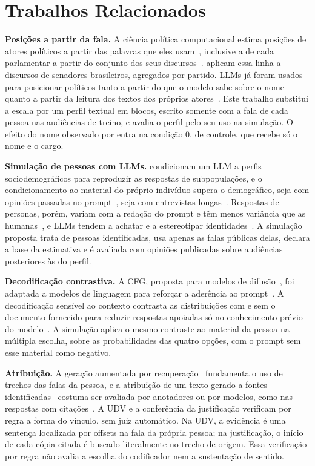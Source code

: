 \section{Trabalhos Relacionados}
\label{sec:relacionados}

\textbf{Posições a partir da fala.} A ciência política computacional estima posições de atores
políticos a partir das palavras que eles usam~\citep{laver2003extracting}, inclusive a de cada
parlamentar a partir do conjunto dos seus discursos~\citep{lauderdale2016measuring}.
\citet{izumi2021government} aplicam essa linha a discursos de senadores brasileiros, agregados por
partido. LLMs já foram usados para posicionar políticos tanto a partir do que o modelo sabe sobre o
nome~\citep{wu2023large} quanto a partir da leitura dos textos dos próprios
atores~\citep{lemens2025positioning}. Este trabalho substitui a escala por um perfil textual em
blocos, escrito somente com a fala de cada pessoa nas audiências de treino, e avalia o perfil pelo seu
uso na simulação. O efeito do nome observado por \citet{wu2023large} entra na condição 0, de
controle, que recebe só o nome e o cargo.

\textbf{Simulação de pessoas com LLMs.} \citet{argyle2023outofone} condicionam um LLM a perfis
sociodemográficos para reproduzir as respostas de subpopulações, e o condicionamento ao material do
próprio indivíduo supera o demográfico, seja com opiniões passadas no
prompt~\citep{hwang2023aligning}, seja com entrevistas longas~\citep{park2026llm}. Respostas de
personas, porém, variam com a redação do prompt e têm menos variância que as
humanas~\citep{bisbee2024synthetic}, e LLMs tendem a achatar e a estereotipar
identidades~\citep{wang2025large}. A simulação proposta trata de pessoas identificadas, usa apenas as
falas públicas delas, declara a base da estimativa e é avaliada com opiniões publicadas sobre
audiências posteriores às do perfil.

\textbf{Decodificação contrastiva.} A CFG, proposta para modelos de difusão~\citep{ho2022classifier},
foi adaptada a modelos de linguagem para reforçar a aderência ao prompt~\citep{sanchez2024stay}. A
decodificação sensível ao contexto contrasta as distribuições com e sem o documento fornecido para
reduzir respostas apoiadas só no conhecimento prévio do modelo~\citep{shi2024trusting}. A simulação
aplica o mesmo contraste ao material da pessoa na múltipla escolha, sobre as probabilidades das quatro
opções, com o prompt sem esse material como negativo.

\textbf{Atribuição.} A geração aumentada por recuperação~\citep{lewis2020rag} fundamenta o uso de
trechos das falas da pessoa, e a atribuição de um texto gerado a fontes
identificadas~\citep{rashkin2023measuring} costuma ser avaliada por anotadores ou por modelos, como
nas respostas com citações~\citep{gao2023enabling}. A UDV e a conferência da justificação verificam
por regra a forma do vínculo, sem juiz automático. Na UDV, a evidência é uma sentença localizada por
offsets na fala da própria pessoa; na justificação, o início de cada cópia citada é buscado
literalmente no trecho de origem. Essa verificação por regra não avalia a escolha do codificador nem
a sustentação de sentido.
